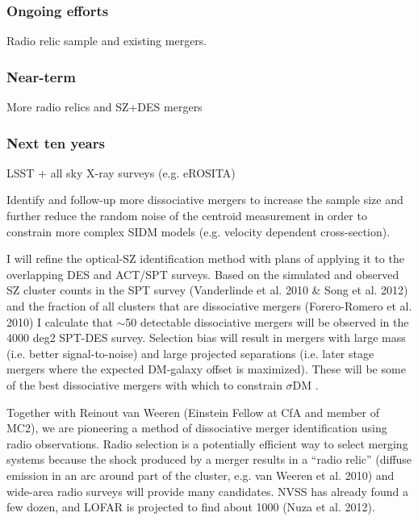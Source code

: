 {\subsubsection{Ongoing efforts}

Radio relic sample and existing mergers.

\subsubsection{Near-term}

More radio relics and SZ+DES mergers

\subsubsection{Next ten years}

LSST + all sky X-ray surveys (e.g. eROSITA)

Identify and follow-up more dissociative mergers to increase the sample size and further reduce the random noise of the centroid measurement in order to constrain more complex SIDM models (e.g. velocity dependent cross-section).

I will refine the optical-SZ identification method with plans of applying it to the overlapping DES and ACT/SPT surveys.  Based on the simulated and observed SZ cluster counts in the SPT survey (Vanderlinde et al. 2010 \& Song et al. 2012) and the fraction of all clusters that are dissociative mergers (Forero-Romero et al. 2010) I calculate that $\sim$50 detectable dissociative mergers will be observed in the 4000 deg2 SPT-DES survey.  Selection bias will result in mergers with large mass (i.e. better signal-to-noise) and large projected separations (i.e. later stage mergers where the expected DM-galaxy offset is maximized).  These will be some of the best dissociative mergers with which to constrain $\sigma$DM .

Together with Reinout van Weeren (Einstein Fellow at CfA and member of MC2), we are pioneering a method of dissociative merger identification using radio observations.  Radio selection is a potentially efficient way to select merging systems because the shock produced by a merger results in a ``radio relic'' (diffuse emission in an arc around part of the cluster, e.g. van Weeren et al. 2010) and wide-area radio surveys will provide many candidates. NVSS has already found a few dozen, and LOFAR is projected to find about 1000 (Nuza et al. 2012).

}
